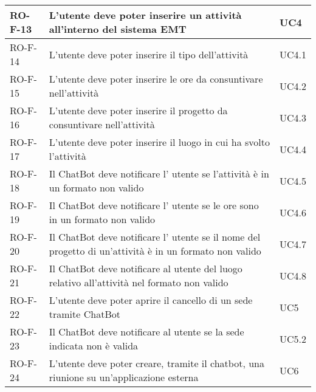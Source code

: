 \begin{center}
\begin{tabular}{ | m{8em} | m{18em} | m{12em} | }
\hline
RO-F-13&L’utente deve poter inserire un attività all’interno del sistema EMT &UC4 \\
\hline
RO-F-14&L’utente deve poter inserire il tipo dell’attività &UC4.1 \\
\hline
RO-F-15&L’utente deve poter inserire le ore da consuntivare nell’attività &UC4.2 \\
\hline  
RO-F-16&L’utente deve poter inserire il progetto da consuntivare nell’attività &UC4.3 \\
\hline
RO-F-17&L’utente deve poter inserire il luogo in cui ha svolto l’attività &UC4.4 \\
\hline
RO-F-18&Il ChatBot deve notificare l' utente se l'attività è in un formato non valido &UC4.5 \\
\hline
RO-F-19&Il ChatBot deve notificare l' utente se le ore sono in un formato non valido &UC4.6 \\
\hline
RO-F-20&Il ChatBot deve notificare l' utente se il nome del progetto di un'attività è in un formato non valido &UC4.7 \\
\hline
RO-F-21&Il ChatBot deve notificare al utente del luogo relativo all’attività nel formato non valido &UC4.8 \\
\hline
RO-F-22&L’utente deve poter aprire il cancello di un sede tramite ChatBot &UC5 \\
\hline
RO-F-23&Il ChatBot deve notificare al utente se la sede indicata non è valida &UC5.2 \\
\hline
RO-F-24&L’utente deve poter creare, tramite il chatbot, una riunione su un'applicazione esterna &UC6 \\
\hline
\end{tabular}
\newpage


\end{center}
